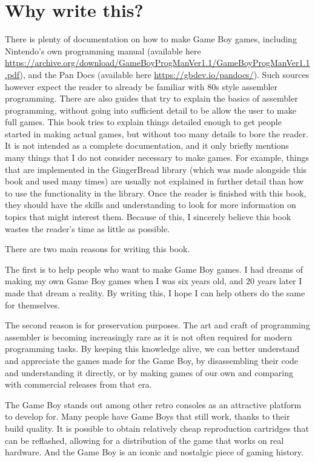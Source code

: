 \documentclass[11pt]{book}
\begin{document}
\section{Why write this?}
There is plenty of documentation on how to make Game Boy games, including Nintendo's own programming manual (available here \url{https://archive.org/download/GameBoyProgManVer1.1/GameBoyProgManVer1.1.pdf}), and the Pan Docs (available here \url{https://gbdev.io/pandocs/}). Such sources however expect the reader to already be familiar with 80s style assembler programming. There are also guides that try to explain the basics of assembler programming, without going into sufficient detail to be allow the user to make full games. This book tries to explain things detailed enough to get people started in making actual games, but without too many details to bore the reader. It is not intended as a complete documentation, and it only briefly mentions many things that I do not consider necessary to make games. For example, things that are implemented in the GingerBread library (which was made alongside this book and used many times) are usually not explained in further detail than how to use the functionality in the library. Once the reader is finished with this book, they should have the skills and understanding to look for more information on topics that might interest them. Because of this, I sincerely believe this book wastes the reader's time as little as possible.

There are two main reasons for writing this book.

The first is to help people who want to make Game Boy games. I had dreams of making my own Game Boy games when I was six years old, and 20 years later I made that dream a reality. By writing this, I hope I can help others do the same for themselves.

The second reason is for preservation purposes. The art and craft of programming assembler is becoming increasingly rare as it is not often required for modern programming tasks. By keeping this knowledge alive, we can better understand and appreciate the games made for the Game Boy, by disassembling their code and understanding it directly, or by making games of our own and comparing with commercial releases from that era. 

The Game Boy stands out among other retro consoles as an attractive platform to develop for. Many people have Game Boys that still work, thanks to their build quality. It is possible to obtain relatively cheap reproduction cartridges that can be reflashed, allowing for a distribution of the game that works on real hardware. And the Game Boy is an iconic and nostalgic piece of gaming history.
\end{document}

